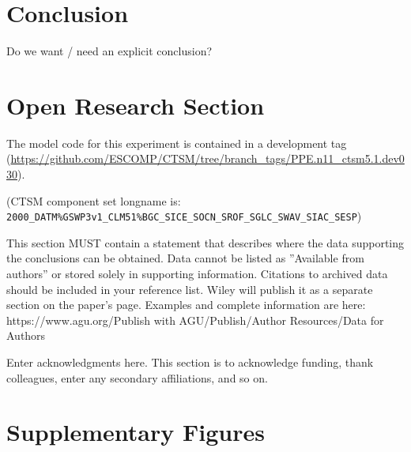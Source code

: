 \documentclass[draft]{agujournal2019}
\begin{document}
\section{Conclusion}
Do we want / need an explicit conclusion?


\section*{Open Research Section}

The model code for this experiment is contained in a development tag (\url{https://github.com/ESCOMP/CTSM/tree/branch_tags/PPE.n11_ctsm5.1.dev030}).

 (CTSM component set longname is: \\ \texttt{2000\_DATM\%GSWP3v1\_CLM51\%BGC\_SICE\_SOCN\_SROF\_SGLC\_SWAV\_SIAC\_SESP})

This section MUST contain a statement that describes where the data supporting the conclusions can be obtained. Data cannot be listed as ''Available from authors'' or stored solely in supporting information. Citations to archived data should be included in your reference list. Wiley will publish it as a separate section on the paper’s page. Examples and complete information are here:
https://www.agu.org/Publish with AGU/Publish/Author Resources/Data for Authors


\acknowledgments
Enter acknowledgments here. This section is to acknowledge funding, thank colleagues, enter any secondary affiliations, and so on.






\appendix
\section{Supplementary Figures}
\end{document}
